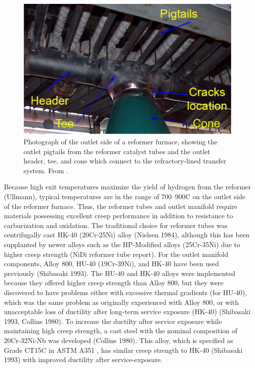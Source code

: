 \begin{figure}[h]
\centering
\includegraphics{figures/reformer-tee-cone}
\caption{Photograph of the outlet side of a reformer furnace, showing the outlet pigtails from the reformer catalyst tubes and the outlet header, tee, and cone which connect to the refractory-lined transfer system.  From \citet{penso_repair_2006}.}
\label{fig:reformer-tee-cone}
\end{figure}

Because high exit temperatures maximize the yield of hydrogen from the reformer (Ullmann), typical temperatures are in the range of 700--900C on the outlet side of the reformer furnace. Thus, the reformer tubes and outlet manifold require materials possessing excellent creep performance in addition to resistance to carburization and oxidation. The traditional choice for reformer tubes was centrifugally cast HK-40 (20Cr-25Ni) alloy  (Nielsen 1984), although this has been supplanted by newer alloys such as the HP-Modified alloys (25Cr-35Ni) due to higher creep strength (NiDi reformer tube report). For the outlet manifold components, Alloy 800, HU-40 (19Cr-39Ni), and HK-40 have been used previously (Shibasaki 1993). The HU-40 and HK-40 alloys were implemented because they offered higher creep strength than Alloy 800, but they were discovered to have problems either with excessive thermal gradients (for HU-40), which was the same problem as originally experienced with Alloy 800, or with unacceptable loss of ductility after long-term service exposure (HK-40) (Shibasaki 1993, Collins 1980). To increase the ductilty after service exposure while maintaining high creep strength, a cast steel with the nominal composition of 20Cr-32Ni-Nb was developed (Collins 1980). This alloy, which is specified as Grade CT15C in ASTM A351 \cite{astm_a351_2010}, has similar creep strength to HK-40 (Shibasaki 1993) with improved ductility after service-exposure. 

